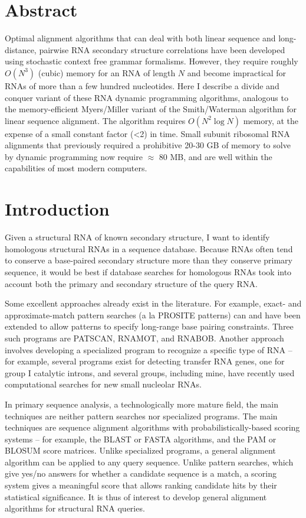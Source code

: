 \documentclass[11pt]{article}
\begin{document}
\section{Abstract}

Optimal alignment algorithms that can deal with both linear sequence
and long-distance, pairwise RNA secondary structure correlations have
been developed using stochastic context free grammar
formalisms. However, they require roughly $O(N^3)$ (cubic) memory for
an RNA of length $N$ and become impractical for RNAs of more than a
few hundred nucleotides. Here I describe a divide and conquer variant
of these RNA dynamic programming algorithms, analogous to the
memory-efficient Myers/Miller variant of the Smith/Waterman algorithm
for linear sequence alignment. The algorithm requires $O(N^2 \log N)$
memory, at the expense of a small constant factor (<2) in time. Small
subunit ribosomal RNA alignments that previously required a
prohibitive 20-30 GB of memory to solve by dynamic programming now
require $\approx$ 80 MB, and are well within the capabilities of most
modern computers.

\section{Introduction}

Given a structural RNA of known secondary structure, I want to
identify homologous structural RNAs in a sequence database. Because
RNAs often tend to conserve a base-paired secondary structure more
than they conserve primary sequence, it would be best if database
searches for homologous RNAs took into account both the primary and
secondary structure of the query RNA.

Some excellent approaches already exist in the literature. For
example, exact- and approximate-match pattern searches (a la PROSITE
patterns) can and have been extended to allow patterns to specify
long-range base pairing constraints. Three such programs are PATSCAN,
RNAMOT, and RNABOB. Another approach involves developing a specialized
program to recognize a specific type of RNA -- for example, several
programs exist for detecting transfer RNA genes, one for group I
catalytic introns, and several groups, including mine, have recently
used computational searches for new small nucleolar RNAs.

In primary sequence analysis, a technologically more mature field, the
main techniques are neither pattern searches nor specialized
programs. The main techniques are sequence alignment algorithms with
probabilistically-based scoring systems -- for example, the BLAST or
FASTA algorithms, and the PAM or BLOSUM score matrices. Unlike
specialized programs, a general alignment algorithm can be applied to
any query sequence. Unlike pattern searches, which give yes/no answers
for whether a candidate sequence is a match, a scoring system gives a
meaningful score that allows ranking candidate hits by their
statistical significance. It is thus of interest to develop general
alignment algorithms for structural RNA queries.
\end{document}
